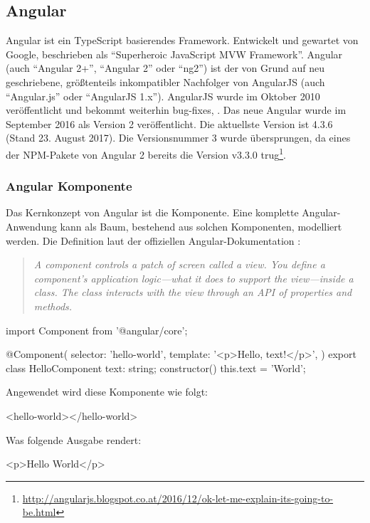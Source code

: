 \subsection{Angular}
\label{sec:angular}
Angular ist ein TypeScript basierendes Framework. Entwickelt und gewartet von Google, beschrieben als "`Superheroic JavaScript MVW Framework"'. Angular (auch "`Angular 2+"', "`Angular 2"' oder "`ng2"') ist der von Grund auf neu geschriebene, größtenteils inkompatibler Nachfolger von AngularJS (auch "`Angular.js"' oder "`AngularJS 1.x"').
AngularJS wurde im Oktober 2010 veröffentlicht und bekommt weiterhin bug-fixes, \etc. Das neue Angular wurde im September 2016 als Version 2 veröffentlicht. Die aktuellste Version ist 4.3.6 (Stand 23. August 2017). Die Versionsnummer 3 wurde übersprungen, da eines der NPM-Pakete von Angular 2 bereits die Version v3.3.0 trug\footnote{\url{http://angularjs.blogspot.co.at/2016/12/ok-let-me-explain-its-going-to-be.html}}.

\subsubsection{Angular Komponente}
Das Kernkonzept von Angular ist die Komponente. Eine komplette Angular-Anwendung kann als Baum, bestehend aus solchen Komponenten, modelliert werden.
Die Definition laut der offiziellen Angular-Dokumentation \cite{angular-component}: 
\begin{quote}
	\begin{english}
		\textit{A component controls a patch of screen called a view. You define a component's application logic—what it does to support the view—inside a class. The class interacts with the view through an API of properties and methods.}
	\end{english}
\end{quote}

\begin{JsCode}
	import { Component } from '@angular/core';
	
	@Component({
		selector: 'hello-world',
		template: '<p>Hello, {{text}}!</p>',
	})
	export class HelloComponent {
		text: string;
		constructor() {
			this.text = 'World';
		}
	}
\end{JsCode}
Angewendet wird diese Komponente wie folgt:
\begin{JsCode}[numbers=none]
	<hello-world></hello-world>
\end{JsCode}
Was folgende Ausgabe rendert:
\begin{JsCode}Hello World</p>
\end{JsCode}

